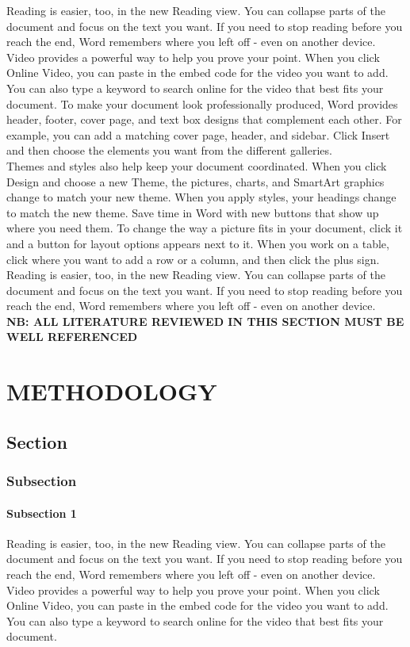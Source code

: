 \documentclass[12pt,a4paper]{report}
\begin{document}
Reading is easier, too, in the new Reading view. You can collapse parts of the document and focus on the text you want. If you need to stop reading before you reach the end, Word remembers where you left off - even on another device.
Video provides a powerful way to help you prove your point. When you click Online Video, you can paste in the embed code for the video you want to add. You can also type a keyword to search online for the video that best fits your document.
To make your document look professionally produced, Word provides header, footer, cover page, and text box designs that complement each other. For example, you can add a matching cover page, header, and sidebar. Click Insert and then choose the elements you want from the different galleries.\\
Themes and styles also help keep your document coordinated. When you click Design and choose a new Theme, the pictures, charts, and SmartArt graphics change to match your new theme. When you apply styles, your headings change to match the new theme.
Save time in Word with new buttons that show up where you need them. To change the way a picture fits in your document, click it and a button for layout options appears next to it. When you work on a table, click where you want to add a row or a column, and then click the plus sign.
Reading is easier, too, in the new Reading view. You can collapse parts of the document and focus on the text you want. If you need to stop reading before you reach the end, Word remembers where you left off - even on another device.\\
\textbf{NB: ALL LITERATURE REVIEWED IN THIS SECTION MUST BE WELL REFERENCED}

\chapter{METHODOLOGY}
\section{Section}
\subsection{Subsection}
\subsubsection{Subsection 1}
Reading is easier, too, in the new Reading view. You can collapse parts of the document and focus on the text you want. If you need to stop reading before you reach the end, Word remembers where you left off - even on another device.
Video provides a powerful way to help you prove your point. When you click Online Video, you can paste in the embed code for the video you want to add. You can also type a keyword to search online for the video that best fits your document.
\end{document}
